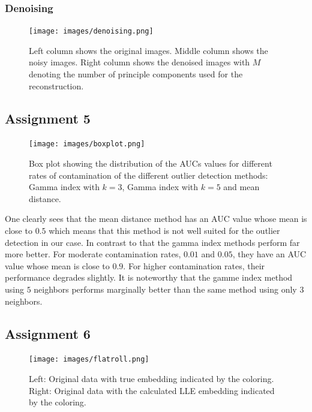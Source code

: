 \documentclass[a4paper, 12pt, titlepage]{article}
\begin{document}
\subsubsection*{Denoising}

\begin{figure}[H]
	\texttt{[image: images/denoising.png]}
	\caption{Left column shows the original images. Middle column shows the noisy images. Right column shows the denoised images with $M$ denoting the number of principle components used for the reconstruction.}
\end{figure}

\subsection*{Assignment 5}

\begin{figure}[H]
	\centering
	\texttt{[image: images/boxplot.png]}
	\caption{Box plot showing the distribution of the AUCs values for different rates of contamination of the different outlier detection methods: Gamma index with $k=3$, Gamma index with $k=5$ and mean distance.}
\end{figure}

One clearly sees that the mean distance method has an AUC value whose mean is close to $0.5$ which means that this method is not well suited for the outlier detection in our case.
In contrast to that the gamma index methods perform far more better.
For moderate contamination rates, $0.01$ and $0.05$, they have an AUC value whose mean is close to $0.9$.
For higher contamination rates, their performance degrades slightly.
It is noteworthy that the gamme index method using $5$ neighbors performs marginally better than the same method using only $3$ neighbors.

\subsection*{Assignment 6}

\begin{figure}[H]
	\centering
	\texttt{[image: images/flatroll.png]}
	\caption{Left: Original data with true embedding indicated by the coloring. 
	Right: Original data with the calculated LLE embedding indicated by the coloring.}
\end{figure}
\end{document}
